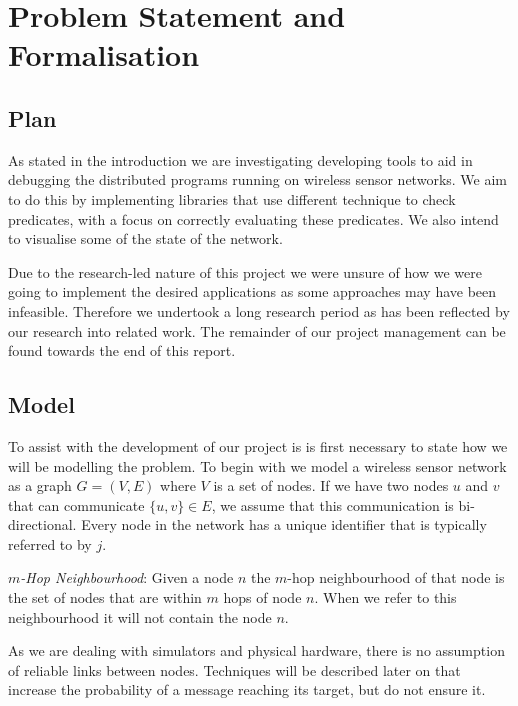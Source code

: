 \section{Problem Statement and Formalisation}

\subsection{Plan}

As stated in the introduction we are investigating developing tools to aid in debugging the distributed programs running on wireless sensor networks. We aim to do this by implementing libraries that use different technique to check predicates, with a focus on correctly evaluating these predicates. We also intend to visualise some of the state of the network.

Due to the research-led nature of this project we were unsure of how we were going to implement the desired applications as some approaches may have been infeasible. Therefore we undertook a long research period as has been reflected by our research into related work. The remainder of our project management can be found towards the end of this report.

\subsection{Model}

To assist with the development of our project is is first necessary to state how we will be modelling the problem. To begin with we model a wireless sensor network as a graph $G = (V, E)$ where $V$ is a set of nodes. If we have two nodes $u$ and $v$ that can communicate $\{u, v\} \in E$, we assume that this communication is bi-directional. Every node in the network has a unique identifier that is typically referred to by $j$.

\begin{mydef}
\emph{$m$-Hop Neighbourhood}: Given a node $n$ the $m$-hop neighbourhood of that node is the set of nodes that are within $m$ hops of node $n$. When we refer to this neighbourhood it will not contain the node $n$.
\end{mydef}

As we are dealing with simulators and physical hardware, there is no assumption of reliable links between nodes. Techniques will be described later on that increase the probability of a message reaching its target, but do not ensure it.

